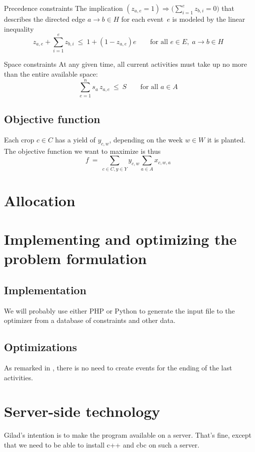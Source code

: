 \documentclass[11pt,reqno]{amsart}
\newcommand{\lra}{\longrightarrow}
\numberwithin{equation}{section}
\begin{document}
\begin{mydesc}
\item[Precedence constraints] The implication $(z_{a,e}=1) \Longrightarrow
  \big(\sum_{i=1}^{e} z_{b,i}=0\big)$ that describes the directed edge $a\lra b\in H$ for
  each event~$e$ is modeled by the linear inequality
  \begin{equation}
     z_{a,e} + \sum_{i=1}^e z_{b,i}
     \ \le \
     1+(1-z_{a,e})e
     \qquad\text{for all } e\in E,\; a\lra b\in H
  \end{equation}

\item[Space constraints] At any given time, all current activities must take up no more
  than the entire available space:
  \begin{equation}
    \sum_{e=1}^n s_a \, z_{a,e} 
    \ \le \
    S \qquad\text{for all } a\in A
  \end{equation}
\end{mydesc}

\subsection{Objective function}

Each crop $c\in C$ has a yield of  $y_{c,w}$, depending on the week
$w\in W$ it is planted. 
The objective function we want to  maximize is thus
\[
   f 
   \ = \
   \sum_{c\in C, y\in Y} y_{c,w} \sum_{a\in A} x_{c,w,a}
\]


\section{Allocation}


\section{Implementing and optimizing the problem formulation}

\subsection{Implementation}

We will probably use either PHP or Python to generate the input file to the optimizer from
a database of constraints and other data.

\subsection{Optimizations}
As remarked in \cite{artigues-etal11}, there is no need to create
events for the ending of the last activities. 

\section{Server-side technology}

Gilad's intention is to make the program available on a server. That's
fine, except that we need to be able to install c++ and cbc on such a server.



\end{document}

